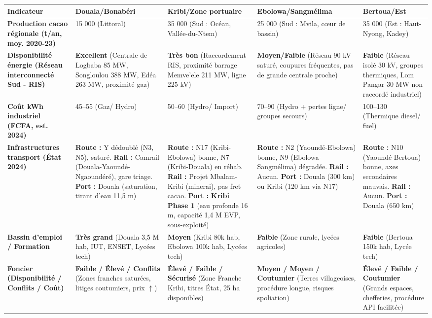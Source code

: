 \documentclass[11pt]{article}
\begin{document}
\begin{center}
\begin{tabularx}{\linewidth}{|l|X|X|X|X|}\hline
\textbf{Indicateur} & \textbf{Douala/Bonabéri} & \textbf{Kribi/Zone portuaire} & \textbf{Ebolowa/Sangmélima} & \textbf{Bertoua/Est} \\ \hline
\textbf{Production cacao régionale (t/an, moy. 2020-23)} & 15 000 (Littoral) & 35 000 (Sud : Océan, Vallée-du-Ntem) & 25 000 (Sud : Mvila, cœur de bassin) & 35 000 (Est : Haut-Nyong, Kadey) \\ \hline
\textbf{Disponibilité énergie (Réseau interconnecté Sud - RIS)} & \textbf{Excellent} (Centrale de Logbaba 85 MW, Songloulou 388 MW, Edéa 263 MW, proximité gaz) & \textbf{Très bon} (Raccordement RIS, proximité barrage Memve'ele 211 MW, ligne 225 kV) & \textbf{Moyen/Faible} (Réseau 90 kV saturé, coupures fréquentes, pas de grande centrale proche) & \textbf{Faible} (Réseau isolé 30 kV, groupes thermiques, Lom Pangar 30 MW non raccordé industriel) \\ \hline
\textbf{Coût kWh industriel (FCFA, est. 2024)} & 45--55 (Gaz/ Hydro) & 50--60 (Hydro/ Import) & 70--90 (Hydro + pertes ligne/ groupes secours) & 100--130 (Thermique diesel/ fuel) \\ \hline
\textbf{Infrastructures transport (État 2024)} & \textbf{Route :} Y dédoublé (N3, N5), saturé. \textbf{Rail :} Camrail (Douala-Yaoundé-Ngaoundéré), gare triage. \textbf{Port :} Douala (saturation, tirant d'eau 11,5 m) & \textbf{Route :} N17 (Kribi-Ebolowa) bonne, N7 (Kribi-Douala) en réhab. \textbf{Rail :} Projet Mbalam-Kribi (minerai), pas fret cacao. \textbf{Port :} \textbf{Kribi Phase 1} (eau profonde 16 m, capacité 1,4 M EVP, sous-exploité) & \textbf{Route :} N2 (Yaoundé-Ebolowa) bonne, N9 (Ebolowa-Sangmélima) dégradée. \textbf{Rail :} Aucun. \textbf{Port :} Douala (300 km) ou Kribi (120 km via N17) & \textbf{Route :} N10 (Yaoundé-Bertoua) bonne, axes secondaires mauvais. \textbf{Rail :} Aucun. \textbf{Port :} Douala (650 km) \\ \hline
\textbf{Bassin d'emploi / Formation} & \textbf{Très grand} (Douala 3,5 M hab, IUT, ENSET, Lycées tech) & \textbf{Moyen} (Kribi 80k hab, Ebolowa 100k hab, Lycées tech) & \textbf{Faible} (Zone rurale, lycées agricoles) & \textbf{Faible} (Bertoua 150k hab, Lycée tech) \\ \hline
\textbf{Foncier (Disponibilité / Conflits / Coût)} & \textbf{Faible / Élevé / Conflits} (Zones franches saturées, litiges coutumiers, prix $\uparrow$) & \textbf{Élevé / Faible / Sécurisé} (Zone Franche Kribi, titres État, 25 ha disponibles) & \textbf{Moyen / Moyen / Coutumier} (Terres villageoises, procédure longue, risques spoliation) & \textbf{Élevé / Faible / Coutumier} (Grands espaces, chefferies, procédure API facilitée) \\ \hline

\end{tabularx}
\end{center}
\end{document}

